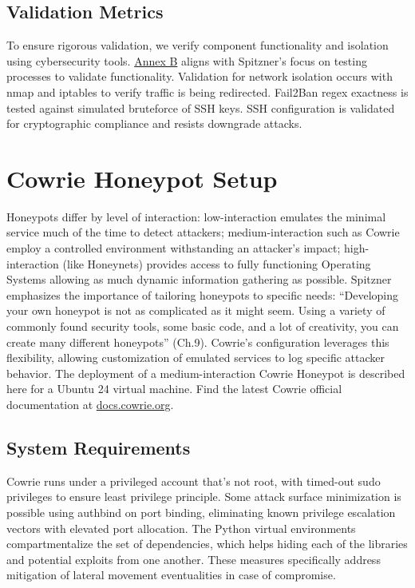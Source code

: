 \documentclass{cls/ULBreport}
\begin{document}

        
        \subsection{Validation Metrics}  
        \label{sec:validation}  
        
        To ensure rigorous validation, we verify component functionality and isolation using cybersecurity tools. \hyperref[annexes:network]{Annex B} aligns with Spitzner's focus on testing processes to validate functionality. Validation for network isolation occurs with nmap and iptables to verify traffic is being redirected. Fail2Ban regex exactness is tested against simulated bruteforce of SSH keys. SSH configuration is validated for cryptographic compliance and resists downgrade attacks.
        


    \section{Cowrie Honeypot Setup}
    Honeypots differ by level of interaction: low-interaction emulates the minimal service much of the time to detect attackers; medium-interaction such as Cowrie employ a controlled environment withstanding an attacker's impact; high-interaction (like Honeynets) provides access to fully functioning Operating Systems allowing as much dynamic information gathering as possible.
    Spitzner emphasizes the importance of tailoring honeypots to specific needs: \enquote{Developing your own honeypot is not as complicated as it might seem. Using a variety of commonly found security tools, some basic code, and a lot of creativity, you can create many different honeypots} (Ch.9). Cowrie’s configuration leverages this flexibility, allowing customization of emulated services to log specific attacker behavior. The deployment of a medium-interaction Cowrie Honeypot is described here for a Ubuntu 24 virtual machine. Find the latest Cowrie official documentation at \href{https://docs.cowrie.org/en/latest/INSTALL.html}{docs.cowrie.org}.
    
\label{sec:cowrie}
    \subsection{System Requirements}
    Cowrie runs under a privileged account that's not root, with timed-out sudo privileges to ensure least privilege principle. Some attack surface minimization is possible using authbind on port binding, eliminating known privilege escalation vectors with elevated port allocation. The Python virtual environments compartmentalize the set of dependencies, which helps hiding each of the libraries and potential exploits from one another. These measures specifically address mitigation of lateral movement eventualities in case of compromise. 
    
\end{document}
